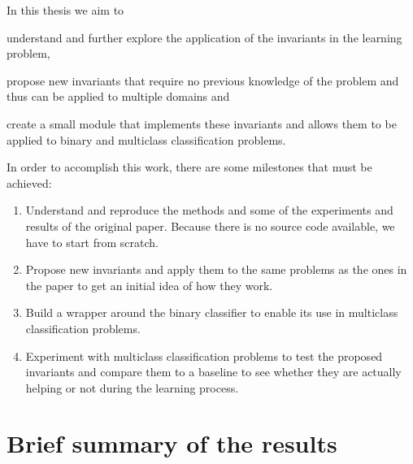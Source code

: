 In this thesis we aim to
\begin{enumerate*}[label=(\roman*)]
    \item understand and further explore the application of the invariants in the learning
    problem,
    \item propose new invariants that require no previous knowledge of the problem and
    thus can be applied to multiple domains and
    \item create a small module that implements these invariants and allows them
    to be applied to binary and multiclass classification problems.
\end{enumerate*}

In order to accomplish this work, there are some milestones that must be achieved:

\begin{enumerate}
    \item Understand and reproduce the methods and some of the experiments and results of the
    original paper. Because there is no source code available, we have to start from scratch.
    \item Propose new invariants and apply them to the same problems as the ones in the paper
    to get an initial idea of how they work.
    \item Build a wrapper around the binary classifier to enable its use in multiclass classification
    problems.
    \item Experiment with multiclass classification problems to test the proposed invariants and
    compare them to a baseline to see whether they are actually helping or not during the learning process.
\end{enumerate}



\section{Brief summary of the results}



